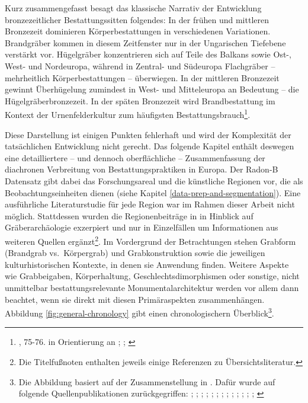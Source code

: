 \documentclass[openany,twoside,twocolumn]{book}
\let\rmarkdownfootnote\footnote%
\def\footnote{\protect\rmarkdownfootnote}
\begin{document}
Kurz zusammengefasst besagt das klassische Narrativ der Entwicklung
bronzezeitlicher Bestattungssitten folgendes: In der frühen und
mittleren Bronzezeit dominieren Körperbestattungen in verschiedenen
Variationen. Brandgräber kommen in diesem Zeitfenster nur in der
Ungarischen Tiefebene verstärkt vor. Hügelgräber konzentrieren sich auf
Teile des Balkans sowie Ost-, West- und Nordeuropa, während in Zentral-
und Südeuropa Flachgräber -- mehrheitlich Körperbestattungen --
überwiegen. In der mittleren Bronzezeit gewinnt Überhügelung zumindest
in West- und Mitteleuropa an Bedeutung -- die Hügelgräberbronzezeit. In
der späten Bronzezeit wird Brandbestattung im Kontext der
Urnenfelderkultur zum häufigsten Bestattungsbrauch\footnote{\textcite{harding_european_2000},
  75-76. in Orientierung an \textcite{hausler_bestattungssitten_1977};
  \textcite{hausler_grab-_1994};
  \textcite{hausler_totenorientierung_1996}}.

Diese Darstellung ist einigen Punkten fehlerhaft und wird der
Komplexität der tatsächlichen Entwicklung nicht gerecht. Das folgende
Kapitel enthält deswegen eine detailliertere -- und dennoch
oberflächliche -- Zusammenfassung der diachronen Verbreitung von
Bestattungspraktiken in Europa. Der Radon-B Datensatz gibt dabei das
Forschungsareal und die künstliche Regionen vor, die als
Beobachtungseinheiten dienen (siehe Kapitel
\ref{data-prep-and-segmentation}). Eine ausführliche Literaturstudie für
jede Region war im Rahmen dieser Arbeit nicht möglich. Stattdessen
wurden die Regionenbeiträge in \textcite{fokkens_oxford_2013} in
Hinblick auf Gräberarchäologie exzerpiert und nur in Einzelfällen um
Informationen aus weiteren Quellen ergänzt\footnote{Die Titelfußnoten
  enthalten jeweils einige Referenzen zu Übersichtsliteratur.}. Im
Vordergrund der Betrachtungen stehen Grabform (Brandgrab vs.~Körpergrab)
und Grabkonstruktion sowie die jeweiligen kulturhistorischen Kontexte,
in denen sie Anwendung finden. Weitere Aspekte wie Grabbeigaben,
Körperhaltung, Geschlechtsdimorphismen oder sonstige, nicht unmittelbar
bestattungsrelevante Monumentalarchitektur werden vor allem dann
beachtet, wenn sie direkt mit diesen Primäraspekten zusammenhängen.
Abbildung \ref{fig:general-chronology} gibt einen chronologischern
Überblick\footnote{Die Abbildung basiert auf der Zusammenstellung in
  \textcite{roberts_old_2013}. Dafür wurde auf folgende
  Quellenpublikationen zurückgegriffen:
  \textcite{arnoldussen_bronze_2008}; \textcite{bourgeois_lage_2005};
  \textcite{burgess_bronze_1974}; \textcite{burgess_age_1980};
  \textcite{brindley_dating_2007}; \textcite{eogan_accomplished_1994};
  \textcite{gerloff_reineckes_2007}; \textcite{gerloff_atlantic_2010};
  \textcite{de_laet_belgique_1982};
  \textcite{lanting_14c-chronologie_2001};
  \textcite{louwe_kooijmanns_prehistory_2005};
  \textcite{needham_chronology_1996};
  \textcite{needham_independent_1997}; \textcite{needham_first_2010}}.
\end{document}
